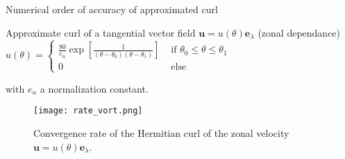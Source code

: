 \documentclass[11pt]{beamer}
\begin{document}

\begin{frame}{Numerical order of accuracy of approximated curl}
\begin{block}{Approximate curl of a tangential vector field $\mathbf{u} = u(\theta) \mathbf{e}_{\lambda}$ (zonal dependance)}
$u(\theta)=\left\lbrace
\begin{array}{ll}
\frac{80}{e_n} \exp\left[ \frac{1}{(\theta-\theta_0)(\theta-\theta_1)} \right] & \text{ if } \theta_0 \leq \theta \leq \theta_1 \\
0 & \text{ else}
\end{array}\right.$ 

with $e_n$ a normalization constant.
\begin{figure}
\texttt{[image: rate\_vort.png]}
\caption{\footnotesize Convergence rate of the Hermitian curl of the zonal 
velocity $\mathbf{u} = u(\theta) \mathbf{e}_{\lambda}$.}
\end{figure}
\end{block}
\end{frame}
\end{document}
